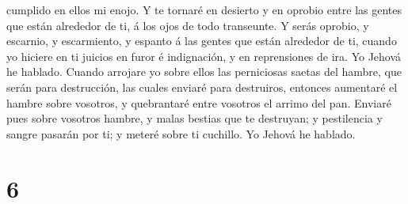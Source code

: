 cumplido en ellos mi enojo.  Y te tornaré en desierto y en
oprobio entre las gentes que están alrededor de ti, á los ojos de todo
transeunte.  Y serás oprobio, y escarnio, y escarmiento, y
espanto á las gentes que están alrededor de ti, cuando yo hiciere en ti
juicios en furor é indignación, y en reprensiones de ira. Yo Jehová he
hablado.  Cuando arrojare yo sobre ellos las perniciosas
saetas del hambre, que serán para destrucción, las cuales enviaré para
destruiros, entonces aumentaré el hambre sobre vosotros, y quebrantaré
entre vosotros el arrimo del pan.  Enviaré pues sobre
vosotros hambre, y malas bestias que te destruyan; y pestilencia y
sangre pasarán por ti; y meteré sobre ti cuchillo. Yo Jehová he hablado.

\hypertarget{section-5}{%
\section{6}\label{section-5}}

